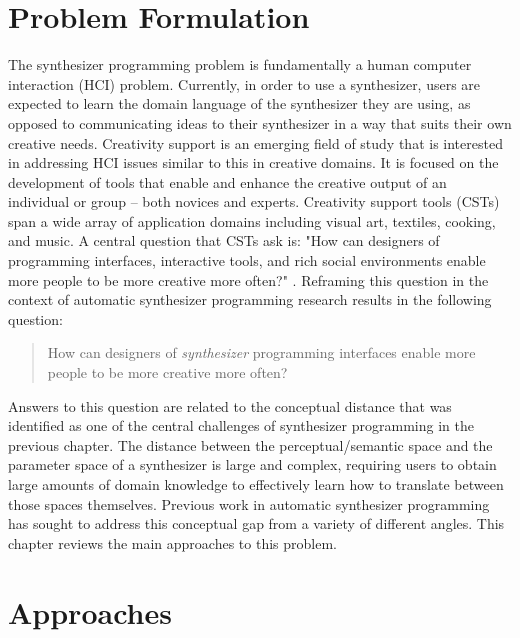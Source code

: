 \section{Problem Formulation}
The synthesizer programming problem is fundamentally a human computer interaction (HCI) problem. Currently, in order to use a synthesizer, users are expected to learn the domain language of the synthesizer they are using, as opposed to communicating ideas to their synthesizer in a way that suits their own creative needs. Creativity support is an emerging field of study that is interested in addressing HCI issues similar to this in creative domains. It is focused on the development of tools that enable and enhance the creative output of an individual or group -- both novices and experts. Creativity support tools (CSTs) \cite{shneiderman2007creativity} span a wide array of application domains including visual art, textiles, cooking, and music. A central question that CSTs ask is: "How can designers of programming interfaces, interactive tools, and rich social environments enable more people to be more creative more often?" \cite{shneiderman2007creativity}. Reframing this question in the context of automatic synthesizer programming research results in the following question:
\begin{quote}
    How can designers of \textit{synthesizer} programming interfaces enable more people to be more creative more often?
\end{quote}

Answers to this question are related to the conceptual distance that was identified as one of the central challenges of synthesizer programming in the previous chapter. The distance between the perceptual/semantic space and the parameter space of a synthesizer is large and complex, requiring users to obtain large amounts of domain knowledge to effectively learn how to translate between those spaces themselves. Previous work in automatic synthesizer programming has sought to address this conceptual gap from a variety of different angles. This chapter reviews the main approaches to this problem.

\section{Approaches}

